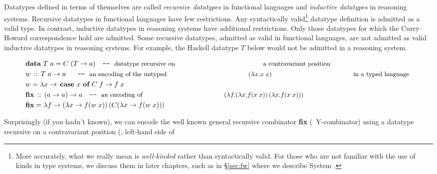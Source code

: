 Datatypes defined in terms of themselves are called \emph{recursive datatypes}
in functional languages and \emph{inductive datatypes} in reasoning systems.
Recursive datatypes in functional languages have few restrictions.
Any syntactically valid\footnote{
        More accurately, what we really mean is \emph{well-kinded} rather than
        syntactically valid. 
        For those who are not familiar with the use of kinds in type systems, 
        we discuss them in later chapters, such as
        in \S\ref{sec:fw} where we describe System \Fw.}
datatype definition is admitted as a valid type. In contrast,
inductive datatypes in reasoning systems have additional restrictions.
Only those datatypes for which the Curry--Howard correspondence hold are
admitted. Some recursive datatypes, admitted as valid in functional languages,
are not admitted as valid inductive datatypes in reasoning systems. For example,
the Haskell datatype $T$ below would not be admitted in a reasoning system.
\vspace*{-2em}
\begin{singlespace}
\begin{align*}
& \textbf{data}~T\;a = C\;(T -> a) \quad
          \texttt{-}\texttt{-}~\text{\small datatype recursive on
                                        a contravariant position} \\
& w \,::\, T\;a -> a ~~ \quad
          \texttt{-}\texttt{-}~\text{\small an encoding of the untyped
                                     $(\lambda x.x\;x)$
                                     in a typed language}~ \\
& w = \lambda x -> \,\textbf{case}~x~\textbf{of}~C\;f -> f\;x \\
& \textbf{fix} \,::\, (a -> a) -> a \quad
          \texttt{-}\texttt{-}~\text{\small an encoding of 
                                     $(\lambda f.(\lambda x.f(x\;x))\,
                                                 (\lambda x.f(x\;x)))$} \\
& \textbf{fix} = \lambda f -> (\lambda x -> f (w\;x))\,(C(\lambda x -> f (w\;x)))
\end{align*}
\end{singlespace}
\vspace*{-0.5em}
\noindent
Surprisingly (if you hadn't known), we can encode the well known
general recursive combinator \textbf{fix} (\aka\ \textsf{Y}-combinator)
using a datatype recursive on a contravariant position (\ie, left-hand side of
